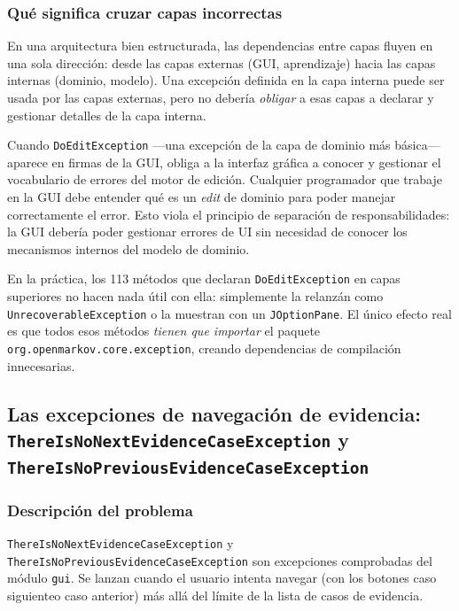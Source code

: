 \documentclass[11pt,a4paper]{article}
\begin{document}
\subsubsection{Qué significa cruzar capas incorrectas}

En una arquitectura bien estructurada, las dependencias entre capas fluyen en una sola
dirección: desde las capas externas (GUI, aprendizaje) hacia las capas internas (dominio,
modelo). Una excepción definida en la capa interna puede ser usada por las capas externas, pero
no debería \emph{obligar} a esas capas a declarar y gestionar detalles de la capa interna.

Cuando \texttt{DoEditException} —una excepción de la capa de dominio más básica— aparece en
firmas de la GUI, obliga a la interfaz gráfica a conocer y gestionar el vocabulario de errores
del motor de edición. Cualquier programador que trabaje en la GUI debe entender qué es un
\textit{edit} de dominio para poder manejar correctamente el error. Esto viola el principio de
separación de responsabilidades: la GUI debería poder gestionar errores de UI sin necesidad de
conocer los mecanismos internos del modelo de dominio.

\begin{consecuenciabox}
    En la práctica, los 113 métodos que declaran \texttt{DoEditException} en capas superiores
    no hacen nada útil con ella: simplemente la relanzán como \texttt{UnrecoverableException}
    o la muestran con un \texttt{JOptionPane}. El único efecto real es que todos esos métodos
    \emph{tienen que importar} el paquete \texttt{org.openmarkov.core.exception}, creando
    dependencias de compilación innecesarias.
\end{consecuenciabox}

\subsection[Las excepciones de navegación de evidencia]{Las excepciones de navegación de evidencia:
\texttt{ThereIsNoNext\-Evidence\-Case\-Exception} y
\texttt{ThereIsNoPrevious\-Evidence\-Case\-Exception}}

\subsubsection{Descripción del problema}

\texttt{ThereIsNoNextEvidenceCaseException} y \texttt{ThereIsNoPreviousEvidenceCaseException}
son excepciones comprobadas del módulo \texttt{gui}. Se lanzan cuando el usuario intenta navegar
(con los botones \guillemotleft caso siguiente\guillemotright  o \guillemotleft caso anterior\guillemotright ) más allá del límite de la lista de casos
de evidencia.
\end{document}
